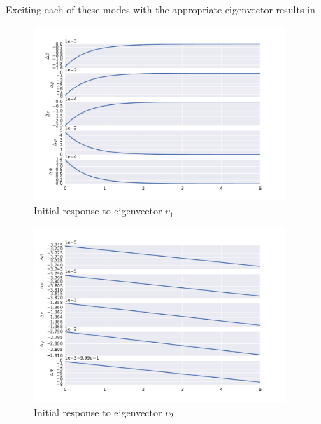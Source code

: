 \documentclass[12pt]{article}
\begin{document}
\noindent Exciting each of these modes with the appropriate eigenvector results in
\begin{figure}[h]
\begin{center}
\includegraphics[width=0.85\textwidth]{figures/LatI2.pdf}
\caption{Initial response to eigenvector $v_1$}
\label{}
\end{center}
\end{figure}

\begin{figure}[h]
\begin{center}
\includegraphics[width=0.85\textwidth]{figures/LatI3.pdf}
\caption{Initial response to eigenvector $v_2$}
\label{}
\end{center}
\end{figure}
\end{document}
